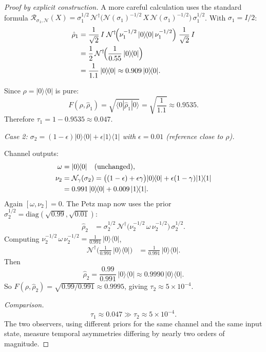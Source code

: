 \documentclass[prl,twocolumn,superscriptaddress,longbibliography]{revtex4-2}
\newcommand{\Petz}{\mathcal{R}}
\newcommand{\chan}{\mathcal{N}}
\newcommand{\ket}[1]{|#1\rangle}
\newcommand{\bra}[1]{\langle#1|}
\newcommand{\tauasym}{\tau}
\begin{document}
\begin{proof}[Proof by explicit construction]
A more careful calculation uses the standard formula
$\Petz_{\sigma_1,\chan}(X) = \sigma_1^{1/2}\,\chan^\dagger\!\big(
\chan(\sigma_1)^{-1/2}\, X\, \chan(\sigma_1)^{-1/2}\big)\,
\sigma_1^{1/2}$.  With $\sigma_1 = I/2$:
\begin{align}
\hat{\rho}_1 &= \frac{1}{\sqrt{2}}\, I\; \chan^\dagger\!\Big(
\nu_1^{-1/2}\,\ket{0}\!\bra{0}\,\nu_1^{-1/2}\Big)\;
\frac{1}{\sqrt{2}}\,I \notag \\
&= \frac{1}{2}\,\chan^\dagger\!\Big(
\frac{1}{0.55}\,\ket{0}\!\bra{0}\Big) \notag \\
&= \frac{1}{1.1}\,\ket{0}\!\bra{0}
\approx 0.909\,\ket{0}\!\bra{0}.
\end{align}

Since $\rho = \ket{0}\!\bra{0}$ is pure:
\begin{equation}
F(\rho, \hat{\rho}_1) = \sqrt{\bra{0}\hat{\rho}_1\ket{0}}
= \sqrt{\frac{1}{1.1}} \approx 0.9535.
\end{equation}
Therefore $\tauasym_1 = 1 - 0.9535 \approx 0.047$.

\emph{Case 2: $\sigma_2 = (1-\epsilon)\ket{0}\!\bra{0}
+ \epsilon\ket{1}\!\bra{1}$ with $\epsilon = 0.01$
(reference close to $\rho$).}

Channel outputs:
\begin{align}
\omega &= \ket{0}\!\bra{0} \quad\text{(unchanged)}, \\
\nu_2 &= \chan_\gamma(\sigma_2) = \big((1-\epsilon) + \epsilon\gamma\big)
\ket{0}\!\bra{0}
+ \epsilon(1-\gamma)\ket{1}\!\bra{1} \notag \\
&= 0.991\,\ket{0}\!\bra{0} + 0.009\,\ket{1}\!\bra{1}.
\end{align}
Again $[\omega, \nu_2] = 0$.  The Petz map now uses the prior
$\sigma_2^{1/2} = \mathrm{diag}(\sqrt{0.99}, \sqrt{0.01})$:
\begin{align}
\hat{\rho}_2 &= \sigma_2^{1/2}\,\chan^\dagger\!\Big(
\nu_2^{-1/2}\,\omega\,\nu_2^{-1/2}\Big)\,\sigma_2^{1/2}.
\end{align}
Computing $\nu_2^{-1/2}\,\omega\,\nu_2^{-1/2}
= \frac{1}{0.991}\,\ket{0}\!\bra{0}$,
\begin{align}
\chan^\dagger\!\Big(\frac{1}{0.991}\,\ket{0}\!\bra{0}\Big)
&= \frac{1}{0.991}\,\ket{0}\!\bra{0}.
\end{align}
Then
\begin{equation}
\hat{\rho}_2 = \frac{0.99}{0.991}\,\ket{0}\!\bra{0}
\approx 0.9990\,\ket{0}\!\bra{0}.
\end{equation}
So $F(\rho, \hat{\rho}_2)
= \sqrt{0.99/0.991} \approx 0.9995$, giving
$\tauasym_2 \approx 5 \times 10^{-4}$.

\emph{Comparison.}
\begin{equation}
\tauasym_1 \approx 0.047 \gg \tauasym_2 \approx 5 \times 10^{-4}.
\end{equation}
The two observers, using different priors for the same channel and
the same input state, measure temporal asymmetries differing by
nearly two orders of magnitude.
\end{proof}
\end{document}
